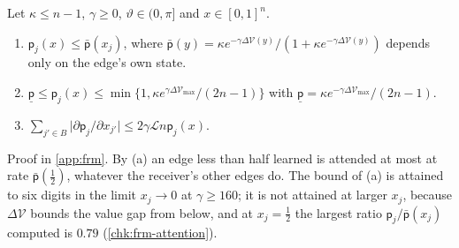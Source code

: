 \begin{lemma}\label{lem:frm-attention}
Let $\kappa\le n-1$, $\gamma\ge0$, $\vartheta\in(0,\pi]$ and $x\in[0,1]^n$.
\begin{enumerate}
\item[(a)] $\mathsf p_j(x)\le\bar{\mathsf p}(x_j)$, where $\bar{\mathsf p}(y)=\kappa e^{-\gamma\Delta\mathcal V(y)}/(1+\kappa e^{-\gamma\Delta\mathcal V(y)})$ depends only on the edge's own state.
\item[(b)] $\underline{\mathsf p}\le\mathsf p_j(x)\le\min\{1,\kappa e^{\gamma\Delta\mathcal V_{\max}}/(2n-1)\}$ with $\underline{\mathsf p}=\kappa e^{-\gamma\Delta\mathcal V_{\max}}/(2n-1)$.
\item[(c)] $\sum_{j'\in B}\vert\partial\mathsf p_j/\partial x_{j'}\vert\le2\gamma\mathcal Ln\mathsf p_j(x)$.
\end{enumerate}
\end{lemma}
Proof in \cref{app:frm}. By (a) an edge less than half learned is attended at most at rate $\bar{\mathsf p}(\frac12)$, whatever the receiver's other edges do. The bound of (a) is attained to six digits in the limit $x_j\to0$ at $\gamma\ge160$; it is not attained at larger $x_j$, because $\Delta\mathcal V$ bounds the value gap from below, and at $x_j=\frac12$ the largest ratio $\mathsf p_j/\bar{\mathsf p}(x_j)$ computed is $0.79$ (\cref{chk:frm-attention}).

